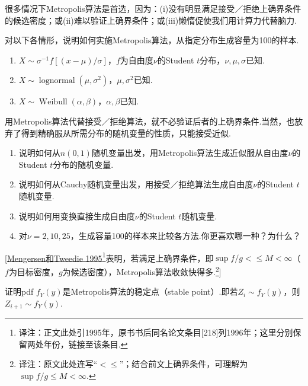 \begin{exercise}\label{exercise:5.67}
很多情况下Metropolis算法是首选，因为：(i)没有明显满足接受／拒绝上确界条件的候选密度；或(ii)难以验证上确界条件；或(iii)懒惰促使我们用计算力代替脑力.

对以下各情形，说明如何实施Metropolis算法，从指定分布生成容量为100的样本.
\begin{enumerate}[label=(\alph*)]
\item $X\sim\sigma^{-1}f[(x-\mu)/\sigma]$，$f$为自由度$\nu$的Student $t$分布，$\nu,\mu,\sigma$已知.
\item $X\sim\operatorname{lognormal}(\mu,\sigma^2)$，$\mu,\sigma^2$已知.
\item $X\sim\operatorname{Weibull}(\alpha,\beta)$，$\alpha,\beta$已知.
\end{enumerate}
\end{exercise}
\begin{exercise}\label{exercise:5.68}
用Metropolis算法代替接受／拒绝算法，就不必验证后者的上确界条件.当然，也放弃了得到精确服从所需分布的随机变量的性质，只能接受近似.
\begin{enumerate}[label=(\alph*)]
\item 说明如何从$n(0,1)$随机变量出发，用Metropolis算法生成近似服从自由度$\nu$的Student $t$分布的随机变量.
\item 说明如何从Cauchy随机变量出发，用接受／拒绝算法生成自由度$\nu$的Student $t$随机变量.
\item 说明如何用变换直接生成自由度$\nu$的Student $t$随机变量.
\item 对$\nu=2,10,25$，生成容量100的样本来比较各方法.你更喜欢哪一种？为什么？
\end{enumerate}
[\hyperref[bib:source218]{Mengersen和Tweedie 1995}\footnote{译注：正文此处引1995年，原书书后同名论文条目[218]列1996年；这里分别保留两处年份，链接至该条目.}表明，若满足上确界条件，即$\sup f/g<\!\le M<\infty$（$f$为目标密度，$g$为候选密度），Metropolis算法收敛快得多.\footnote{译注：原文此处连写“$<\!\le$”；结合前文上确界条件，可理解为$\sup f/g\le M<\infty$.}]
\end{exercise}
\begin{exercise}\label{exercise:5.69}
证明pdf $f_Y(y)$是Metropolis算法的稳定点（stable point）.即若$Z_i\sim f_Y(y)$，则$Z_{i+1}\sim f_Y(y)$.
\end{exercise}
